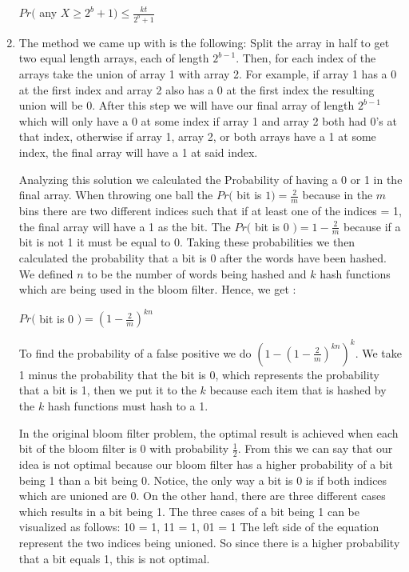 \documentclass[11pt]{amsart}
\begin{document}
\begin{enumerate}
{  
$Pr($ any $X \geq 2^b + 1) \leq \frac{kt}{2^b+1}$

 
}

\item {}

{

The method we came up with is the following: Split the array in half to get two equal length arrays, each of length $2^{b-1}$. Then, for each index of the arrays take the union of array 1 with array 2. For example, if array 1 has a 0 at the first index and array 2 also has a 0 at the first index the resulting union will be 0.  After this step we will have our final array of length $2^{b-1}$ which will only have a 0 at some index if array 1 and array 2 both had 0's at that index, otherwise if array 1, array 2, or both arrays have a 1 at some index, the final array will have a 1 at said index. 

Analyzing this solution we calculated the Probability of having a 0 or 1 in the final array. When throwing one ball the $Pr($ bit is $1) = \frac{2}{m}$ because in the $m$ bins there are two different indices such that if at least one of the indices = 1, the final array will have a 1 as the bit. The $Pr($ bit is 0 $) = 1-\frac{2}{m}$ because if a bit is not 1 it must be equal to 0. Taking these probabilities we then calculated the probability that a bit is 0 after the words have been hashed.  We defined $n$ to be the number of words being hashed and $k$ hash functions which are being used in the bloom filter. Hence, we get :

 $Pr($ bit is 0 $) = (1-\frac{2}{m})^{kn}$
 
 
To find the probability of a false positive  we do $(1-(1-\frac{2}{m})^{kn})^k$. We take 1 minus the probability that the bit is 0, which represents the probability that a bit is 1, then we put it to the $k$ because each item that is hashed by the $k$ hash functions must hash to a 1.

In the original bloom filter problem, the optimal result is achieved when each bit of the bloom filter is 0 with probability $\frac{1}{2}$.  From this we can say that our idea is not optimal because our bloom filter has a higher probability of a bit being 1 than a bit being 0. Notice, the only way a bit is 0 is if both indices which are unioned are 0.  On the other hand,  there are three different cases which results in a bit being 1.  The three cases of a bit being 1 can be visualized as follows:
 10 = 1, 
 11 = 1,
 01 = 1
The left side of the equation represent the two indices being unioned. So since there is a higher probability that a bit equals 1, this is not optimal.



}
\end{enumerate}
\end{document}
